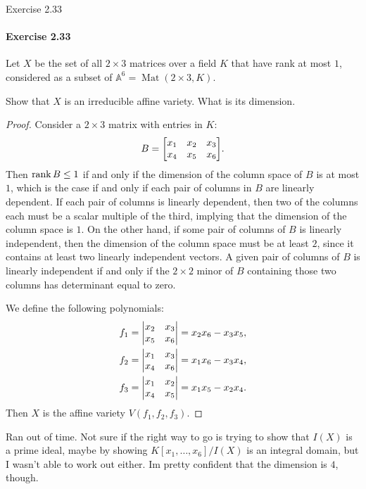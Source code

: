 \documentclass[12pt]{article}
\newenvironment{fullbox}{\begin{lrbox}{\savefullbox}\begin{minipage}{\dimexpr\textwidth-2\fboxsep\relax}}{\end{minipage}\end{lrbox}\begin{center}\framebox[\textwidth]{\usebox{\savefullbox}}\end{center}}
\newenvironment{pbox}[1][]{\begin{fullbox}\ifx#1\empty\else\paragraph{#1}\fi}{\end{fullbox}}
\theoremstyle{definition}
\newcommand{\<}{\langle}
\renewcommand{\>}{\rangle}
\newcommand{\A}{\mathbb{A}}
\begin{document}
\thispagestyle{title}

\begin{pbox}[Exercise 2.33]
    Let $X$ be the set of all $2 \times 3$ matrices over a field $K$ that have rank at most $1$, considered as a subset of $\A^6 = \operatorname{Mat}(2 \times 3, K)$.
    
    \vspace{6pt}

    Show that $X$ is an irreducible affine variety. What is its dimension.
\end{pbox}

\begin{proof}
    Consider a $2 \times 3$ matrix with entries in $K$:
    \[
        B = \mqty[x_1 & x_2 & x_3 \\ x_4 & x_5 & x_6].
    \]
    Then $\rank B \leq 1$ if and only if the dimension of the column space of $B$ is at most $1$, which is the case if and only if each pair of columns in $B$ are linearly dependent. If each pair of columns is linearly dependent, then two of the columns each must be a scalar multiple of the third, implying that the dimension of the column space is $1$. On the other hand, if some pair of columns of $B$ is linearly independent, then the dimension of the column space must be at least $2$, since it contains at least two linearly independent vectors. A given pair of columns of $B$ is linearly independent if and only if the $2 \times 2$ minor of $B$ containing those two columns has determinant equal to zero.
    
    We define the following polynomials:
    \begin{align*}
        f_1 &= \mqty|x_2 & x_3 \\ x_5 & x_6| = x_2x_6 - x_3x_5, \\
        f_2 &= \mqty|x_1 & x_3 \\ x_4 & x_6| = x_1x_6 - x_3x_4, \\
        f_3 &= \mqty|x_1 & x_2 \\ x_4 & x_5| = x_1x_5 - x_2x_4.
    \end{align*}
    Then $X$ is the affine variety $V(f_1, f_2, f_3)$. 

\end{proof}

Ran out of time. Not sure if the right way to go is trying to show that $I(X)$ is a prime ideal, maybe by showing $K[x_1, \dots, x_6]/I(X)$ is an integral domain, but I wasn't able to work out either. Im pretty confident that the dimension is $4$, though.
\end{document}
